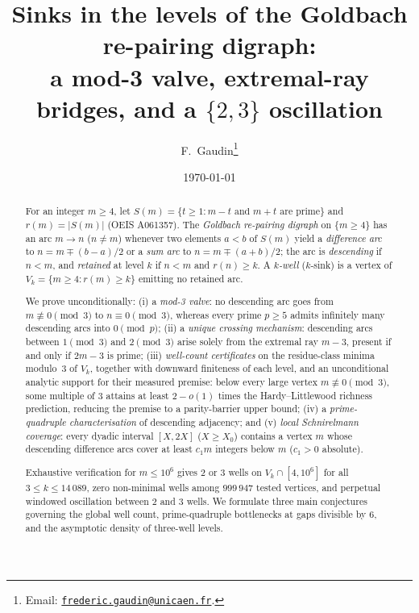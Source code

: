 \documentclass[11pt]{article}
\title{Sinks in the levels of the Goldbach re-pairing digraph:\\
a mod-3 valve, extremal-ray bridges, and a $\{2,3\}$ oscillation}
\author{F.~Gaudin\thanks{Email: \href{mailto:frederic.gaudin@unicaen.fr}{\texttt{frederic.gaudin@unicaen.fr}}.}}
\date{\today}
\theoremstyle{plain}
\theoremstyle{definition}
\begin{document}
\maketitle
\begin{NoHyper}
\begingroup
\renewcommand{\thefootnote}{}
\endgroup
\end{NoHyper}

\begin{abstract}
For an integer $m \ge 4$, let $S(m) = \{t \ge 1 : m-t \text{ and }
m+t \text{ are prime}\}$ and $r(m) = |S(m)|$ (OEIS A061357). The
\emph{Goldbach re-pairing digraph} on $\{m \ge 4\}$ has an arc
$m \to n$ ($n \neq m$) whenever two elements $a < b$ of $S(m)$
yield a \emph{difference arc} to $n = m \mp (b-a)/2$ or a
\emph{sum arc} to $n = m \mp (a+b)/2$; the arc is \emph{descending}
if $n < m$, and \emph{retained} at level $k$ if $n < m$ and
$r(n) \ge k$. A \emph{$k$-well} ($k$-sink) is a vertex of
$V_k = \{m \ge 4 : r(m) \ge k\}$ emitting no retained arc.

We prove unconditionally: (i) a \emph{mod-3 valve}: no descending
arc goes from $m \not\equiv 0 \pmod 3$ to $n \equiv 0 \pmod 3$,
whereas every prime $p \ge 5$ admits infinitely many descending arcs
into $0 \pmod p$; (ii) a \emph{unique crossing mechanism}: descending
arcs between $1 \pmod 3$ and $2 \pmod 3$ arise solely from the
extremal ray $m-3$, present if and only if $2m-3$ is prime; (iii)
\emph{well-count certificates} on the residue-class minima modulo~$3$
of $V_k$, together with downward finiteness of each level, and an
unconditional analytic support for their measured premise: below
every large vertex $m \not\equiv 0 \pmod 3$, some multiple of $3$
attains at least $2 - o(1)$ times the Hardy--Littlewood richness
prediction, reducing the premise to a parity-barrier upper bound;
(iv) a
\emph{prime-quadruple characterisation} of descending adjacency;
and (v) \emph{local Schnirelmann coverage}: every dyadic interval
$[X,2X]$ ($X \ge X_0$) contains a vertex $m$ whose descending
difference arcs cover at least $c_1 m$ integers below $m$ ($c_1 > 0$
absolute).

Exhaustive verification for $m \le 10^6$ gives $2$ or $3$ wells on
$V_k \cap [4,10^6]$ for all $3 \le k \le 14\,089$, zero non-minimal
wells among $999\,947$ tested vertices, and perpetual windowed
oscillation between $2$ and $3$ wells. We formulate three main
conjectures governing the global well count, prime-quadruple
bottlenecks at gaps divisible by $6$, and the asymptotic density of
three-well levels.
\end{abstract}
\end{document}
